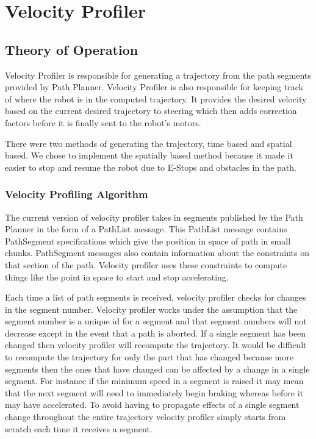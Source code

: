 \section{Velocity Profiler}

\subsection{Theory of Operation}

Velocity Profiler is responsible for generating a trajectory from the path segments provided by Path Planner.  Velocity Profiler is also responsible for keeping track of where the robot is in the computed trajectory. It provides the desired velocity based on the current desired trajectory to steering which then adds correction factors before it is finally sent to the robot's motors.

There were two methods of generating the trajectory, time based and
spatial based.  We chose to implement the spatially based method
because it made it easier to stop and resume the robot due to E-Stops
and obstacles in the path.

\subsubsection{Velocity Profiling Algorithm}

The current version of velocity profiler takes in segments published by the Path Planner in the form of a PathList message. This PathList message contains PathSegment specifications which give the position in space of path in small chunks. PathSegment messages also contain information about the constraints on that section of the path. Velocity profiler uses these constraints to compute things like the point in space to start and stop accelerating.

Each time a list of path segments is received, velocity profiler checks for changes in the segment number. Velocity profiler works under the assumption that the segment number is a unique id for a segment and that segment numbers will not decrease except in the event that a path is aborted. If a single segment has been changed then velocity profiler will recompute the trajectory. It would be difficult to recompute the trajectory for only the part that has changed because more segments then the ones that have changed can be affected by a change in a single segment. For instance if the minimum speed in a segment is raised it may mean that the next segment will need to immediately begin braking whereas before it may have accelerated. To avoid having to propagate effects of a single segment change throughout the entire trajectory velocity profiler simply starts from scratch each time it receives a segment.

